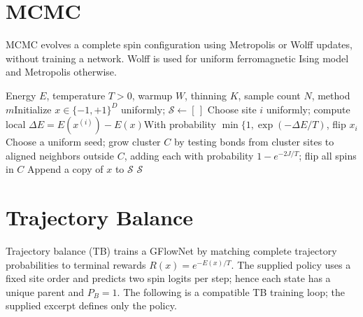 \documentclass{article}
\begin{document}
\section{MCMC}

MCMC evolves a complete spin configuration using Metropolis or Wolff updates, without training a network. Wolff is used for uniform ferromagnetic Ising model and Metropolis otherwise. 

\begin{algorithm}[H]\caption{MCMC Sampling}
    \begin{algorithmic}[1]
        \Require Energy $E$, temperature $T>0$, warmup $W$, thinning $K$, sample count $N$, method $m$\State Initialize $x\in\{-1,+1\}^{D}$ uniformly; $\mathcal{S}\gets[\,]$
            \State 
                Choose site $i$ uniformly; 
                compute local $\Delta E=E(x^{(i)})-E(x)$\State With probability $\min\{1,\exp(-\Delta E/T)$, flip $x_i$
            \Else\State 
                Choose a uniform seed; 
                grow cluster $C$ by testing bonds from cluster sites to aligned neighbors outside $C$, adding each with probability $1-e^{-2J/T}$; 
                flip all spins in $C$
            \EndIf
            \State 
                Append a copy of $x$ to $\mathcal{S}$
            \EndIf
        \EndFor
    \State
\Return $\mathcal{S}$

\end{algorithmic}
\end{algorithm}

\section{Trajectory Balance}

Trajectory balance (TB) trains a GFlowNet by matching complete trajectory probabilities to terminal rewards $R(x)=e^{-E(x)/T}$. The supplied policy uses a fixed site order and predicts two spin logits per step; hence each state has a unique parent and $P_B=1$. The following is a compatible TB training loop; the supplied excerpt defines only the policy.
\end{document}
